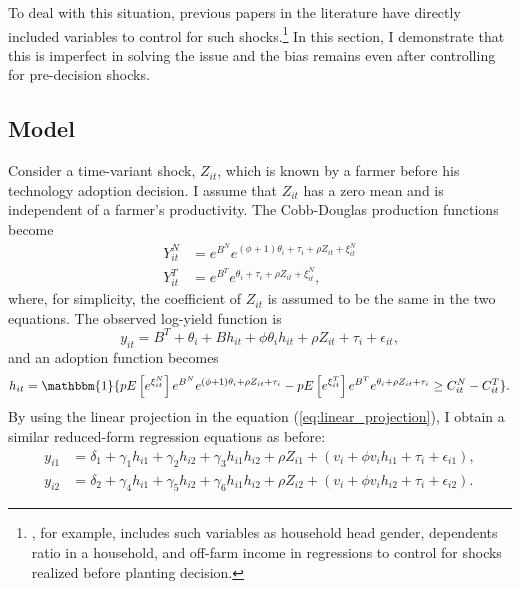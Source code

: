 \documentclass[11pt,letterpaper]{article}
\begin{document}
To deal with this situation, previous papers in the literature have directly included variables to control for such shocks.\footnote{
  \citet{Michler2019}, for example, includes such variables as household head gender, dependents ratio in a household, and off-farm income in regressions to control for shocks realized before planting decision.
}
In this section, I demonstrate that this is imperfect in solving the issue and the bias remains even after controlling for pre-decision shocks.

\subsection{Model}

Consider a time-variant shock, $Z_{it}$, which is known by a farmer before his technology adoption decision.
I assume that $Z_{it}$ has a zero mean and is independent of a farmer's productivity.
The Cobb-Douglas production functions become
\begin{align*}
  Y_{it}^N &= e^{B^N} e^{(\phi + 1) \theta_i + \tau_i + \rho Z_{it} + \xi_{it}^N} \\
  Y_{it}^T &= e^{B^T} e^{\theta_i + \tau_i + \rho Z_{it} + \xi_{it}^N},
\end{align*}
where, for simplicity, the coefficient of $Z_{it}$ is assumed to be the same in the two equations.
The observed log-yield function is
\begin{equation*}
  y_{it} = B^T + \theta_i + B h_{it} + \phi \theta_i h_{it} + \rho Z_{it} + \tau_i + \epsilon_{it},
\end{equation*}
and an adoption function becomes
\begin{equation}\label{eq:adoption}
  h_{it} = \mathbbm{1}\{p E\left[e^{\xi_{it}^N} \right] e^{B^N} e^{(\phi + 1) \theta_i + \rho Z_{it} + \tau_i} - p E\left[e^{\xi_{it}^T} \right] e^{B^T} e^{\theta_i + \rho Z_{it} + \tau_i} \ge C_{it}^N - C_{it}^T\}.
\end{equation}
By using the linear projection in the equation (\ref{eq:linear_projection}), I obtain a similar reduced-form regression equations as before:
\begin{align*}
  y_{i1} &= \delta_1 + \gamma_1 h_{i1} + \gamma_2 h_{i2} + \gamma_3 h_{i1} h_{i2} + \rho Z_{i1} + (v_i + \phi v_i h_{i1} + \tau_i + \epsilon_{i1}), \\
  y_{i2} &= \delta_2 + \gamma_4 h_{i1} + \gamma_5 h_{i2} + \gamma_6 h_{i1} h_{i2} + \rho Z_{i2} + (v_i + \phi v_i h_{i2} + \tau_i + \epsilon_{i2}).
\end{align*}
\end{document}
